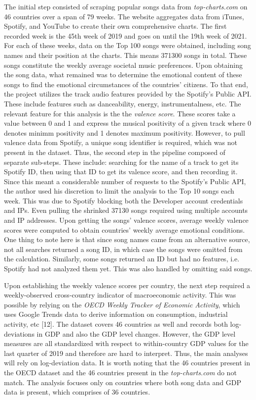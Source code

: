 \documentclass[12pt]{article}
\begin{document}
The initial step consisted of scraping popular songs data from \textit{top-charts.com} on 46 countries over a span of 79 weeks. The website aggregates data from iTunes, Spotify, and YouTube to create their own comprehensive charts. The first recorded week is the 45th week of 2019 and goes on until the 19th week of 2021. For each of these weeks, data on the Top 100 songs were obtained, including song names and their position at the charts. This means 371300 songs in total. These songs constitute the weekly average societal music preferences. Upon obtaining the song data, what remained was to determine the emotional content of these songs to find the emotional circumstances of the countries' citizens. To that end, the project utilizes the track audio features provided by the Spotify's Public API. These include features such as danceability, energy, instrumentalness, etc. The relevant feature for this analysis is the the \textit{valence score}. These scores take a value between 0 and 1 and express the musical positivity of a given track where 0 denotes minimm positivity and 1 denotes maximum positivity. However, to pull valence data from Spotify, a unique song identifier is required, which was not present in the dataset. Thus, the second step in the pipeline composed of separate sub-steps. These include: searching for the name of a track to get its Spotify ID, then using that ID to get its valence score, and then recording it. Since this meant a considerable number of requests to the Spotify's Public API, the author used his discretion to limit the analysis to the Top 10 songs each week. This was due to Spotify blocking both the Developer account credentials and IPs. Even pulling the shrinked 37130 songs required using multiple accounts and IP addresses. Upon getting the songs' valence scores, average weekly valence scores were computed to obtain countries' weekly average emotional conditions. One thing to note here is that since song names came from an alternative source, not all searches returned a song ID, in which case the songs were omitted from the calculation. Similarly, some songs returned an ID but had no features, i.e. Spotify had not analyzed them yet. This was also handled by omitting said songs.

Upon establishing the weekly valence scores per country, the next step required a weekly-observed cross-country indicator of macroeconomic activity. This was possible by relying on the \textit{OECD Weekly Tracker of Economic Activity}, which uses Google Trends data to derive information on consumption, industrial activity, etc [12]. The dataset covers 46 countries as well and records both log-deviations in GDP and also the GDP level changes. However, the GDP level measures are all standardized with respect to within-country GDP values for the last quarter of 2019 and therefore are hard to interpret. Thus, the main analyses will rely on log-deviation data. It is worth noting that the 46 countries present in the OECD dataset and the 46 countries present in the \textit{top-charts.com} do not match. The analysis focuses only on countries where both song data and GDP data is present, which comprises of 36 countries. 
\end{document}
